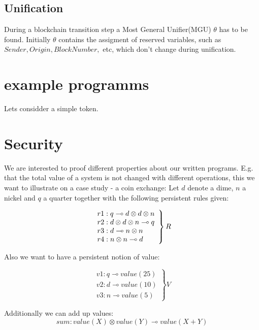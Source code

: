 \documentclass[sigconf]{acmart}
\begin{document}
\subsection{Unification}
During a blockchain transition step a Most General Unifier(MGU) $\theta$ has to be found. Initially $\theta$ contains the assigment of reserved variables, such as $Sender, Origin, BlockNumber, $ etc, which don't change during unification.


\section{example programms}

Lets considder a simple token.


\section{Security}
We are interested to proof different properties about our written programs. E.g. that the total value of a system is not changed with different operations, this we want to illustrate on a case study - a coin exchange:
Let $d$ denote a dime, $n$ a nickel and $q$ a quarter together with the following persistent rules given:

\[\left.\\
\begin{array}{l}
r1: q\multimap d\otimes d\otimes n \\
r2: d\otimes d\otimes n\multimap q \\
r3: d\multimap n\otimes n \\
r4: n\otimes n\multimap d \\
\end{array}
\right\} R\]

Also we want to have a persistent notion of value:

\[ \left.
\begin{array}{l}
  v1: q\multimap value(25) \\
  v2: d\multimap value(10) \\
  v3: n\multimap value(5)
\end{array}
\right\} V \]

Additionally we can add up values:
\[ sum: value(X)\otimes value(Y)\multimap value(X + Y) \]
\end{document}
